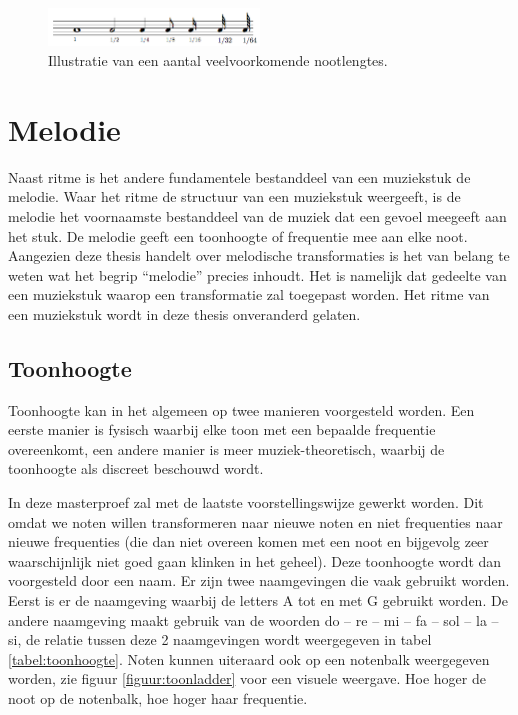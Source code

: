 \begin{figure}[!ht]
  \centering
  \includegraphics[width=0.5\textwidth]{1_Muzikale_Achtergrond/nootlengtes}
  \caption{Illustratie van een aantal veelvoorkomende nootlengtes.}
  \label{figuur:nootlengtes}
\end{figure}

\section{Melodie}
Naast ritme is het andere fundamentele bestanddeel van een muziekstuk de melodie. Waar het ritme de structuur van een muziekstuk weergeeft, is de melodie het voornaamste bestanddeel van de muziek dat een gevoel meegeeft aan het stuk. De melodie geeft een toonhoogte of frequentie mee aan elke noot. Aangezien deze thesis handelt over melodische transformaties is het van belang te weten wat het begrip ``melodie'' precies inhoudt. Het is namelijk dat gedeelte van een muziekstuk waarop een transformatie zal toegepast worden. Het ritme van een muziekstuk wordt in deze thesis onveranderd gelaten.

\subsection{Toonhoogte}
Toonhoogte kan in het algemeen op twee manieren voorgesteld worden. Een eerste manier is fysisch waarbij elke toon met een bepaalde frequentie overeenkomt, een andere manier is meer muziek-theoretisch, waarbij de toonhoogte als discreet beschouwd wordt. 

In deze masterproef zal met de laatste voorstellingswijze gewerkt worden. Dit omdat we noten willen transformeren naar nieuwe noten en niet frequenties naar nieuwe frequenties (die dan niet overeen komen met een noot en bijgevolg zeer waarschijnlijk niet goed gaan klinken in het geheel). Deze toonhoogte wordt dan voorgesteld door een naam. Er zijn twee naamgevingen die vaak gebruikt worden. Eerst is er de naamgeving waarbij de letters A tot en met G gebruikt worden. De andere naamgeving maakt gebruik van de woorden do -- re -- mi -- fa -- sol -- la -- si, de relatie tussen deze 2 naamgevingen wordt weergegeven in tabel \ref{tabel:toonhoogte}. Noten kunnen uiteraard ook op een notenbalk weergegeven worden, zie figuur \ref{figuur:toonladder} voor een visuele weergave. Hoe hoger de noot op de notenbalk, hoe hoger haar frequentie.

